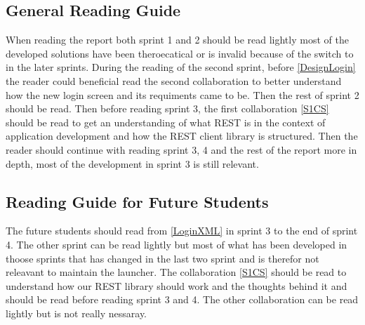 \subsection{General Reading Guide}
When reading the report both sprint 1 and 2 should be read lightly most of the
developed solutions have been theroecatical or is invalid because of the
switch to  in the later sprints. During the reading of the second
sprint, before \autoref{DesignLogin} the reader could beneficial read the second
collaboration to better understand how the new login screen and its requiments
came to be. Then the rest of sprint 2 should be read. Then before reading sprint
3, the first collaboration \autoref{S1CS} should be read to get an understanding
of what REST is in the context of application development and how the REST client library is structured. 
Then the reader should continue with reading sprint 3, 4 and the rest of the
report more in depth, most of the development in sprint 3 is still relevant.

\subsection{Reading Guide for Future Students}
The future students should read from \autoref{LoginXML} in sprint 3 to the end
of sprint 4. The other sprint can be read lightly but most of what has been
developed in thoose sprints that has changed in the last two sprint and is
therefor not releavant to maintain the launcher. The collaboration
\autoref{S1CS} should be read to understand how our REST library should work and
the thoughts behind it and should be read before reading sprint 3 and 4. The
other collaboration can be read lightly but is not really nessaray.


